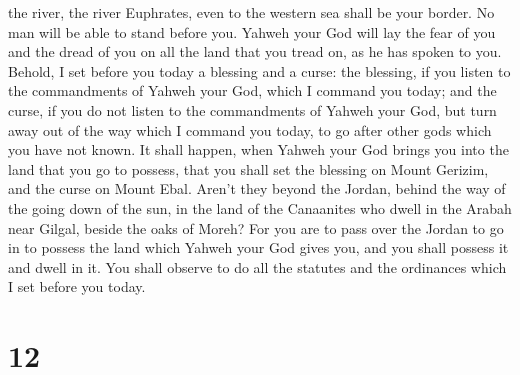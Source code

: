 the river, the river Euphrates, even to the western sea shall be your
border.  No man will be able to stand before you. Yahweh
your God will lay the fear of you and the dread of you on all the land
that you tread on, as he has spoken to you.  Behold, I set
before you today a blessing and a curse:  the blessing, if
you listen to the commandments of Yahweh your God, which I command you
today;  and the curse, if you do not listen to the
commandments of Yahweh your God, but turn away out of the way which I
command you today, to go after other gods which you have not known.
 It shall happen, when Yahweh your God brings you into the
land that you go to possess, that you shall set the blessing on Mount
Gerizim, and the curse on Mount Ebal.  Aren't they beyond
the Jordan, behind the way of the going down of the sun, in the land of
the Canaanites who dwell in the Arabah near Gilgal, beside the oaks of
Moreh?  For you are to pass over the Jordan to go in to
possess the land which Yahweh your God gives you, and you shall possess
it and dwell in it.  You shall observe to do all the
statutes and the ordinances which I set before you today.

\hypertarget{section-11}{%
\section{12}\label{section-11}}

